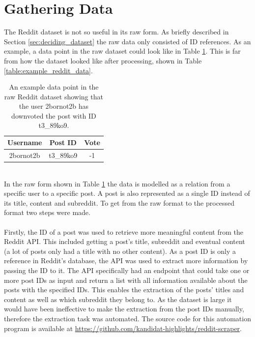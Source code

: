 \section{Gathering Data}\label{sec:gathering_data}
The Reddit dataset is not so useful in its raw form. As briefly described in Section \ref{sec:deciding_dataset} the raw data only consisted of ID references. As an example, a data point in the raw dataset could look like in Table \ref{table:raw_reddit_data}. This is far from how the dataset looked like after processing, shown in Table \ref{table:example_reddit_data}.
\begin{table}[h!]
    \centering
    \begin{tabular}{ c c c } 
        \hline
        \textbf{Username} & \textbf{Post ID} & \textbf{Vote} \\
        \hline
        \hline
        2bornot2b & t3\_89ko9 &-1\\
        \hline
    \end{tabular}
    \caption{An example data point in the raw Reddit dataset showing that the user 2bornot2b has downvoted the post with ID t3\_89ko9.}
    \label{table:raw_reddit_data}
\end{table}
\\
In the raw form shown in Table \ref{table:raw_reddit_data} the data is modelled as a relation from a specific user to a specific post. A post is also represented as a single ID instead of its title, content and subreddit. To get from the raw format to the processed format two steps were made.   
\\\\
Firstly, the ID of a post was used to retrieve more meaningful content from the Reddit API. This included getting a post's title, subreddit and eventual content (a lot of posts only had a title with no other content). As a post ID is only a reference in Reddit's database, the API was used to extract more information by passing the ID to it. The API specifically had an endpoint that could take one or more post IDs as input and return a list with all information available about the posts with the specified IDs. This enables the extraction of the posts' titles and content as well as which subreddit they belong to. As the dataset is large it would have been ineffective to make the extraction from the post IDs manually, therefore the extraction task was automated. The source code for this automation program is available at \url{https://github.com/kandidat-highlights/reddit-scraper}.
\\\\
